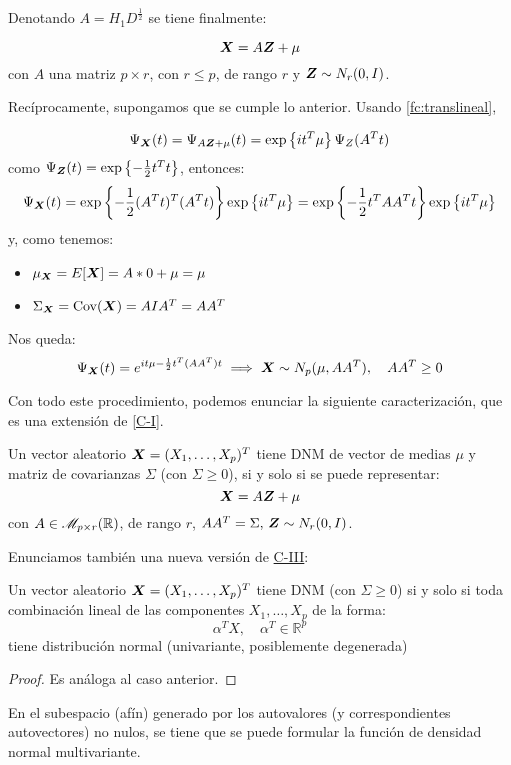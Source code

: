 Denotando $A= H_1D^{\frac{1}{2}}$ se tiene finalmente:

\[
\boldsymbol{X} = A\boldsymbol{Z} + \mu
\]
con $A$ una matriz $p\times r$, con $r\leq p$, de rango $r$ y $\boldsymbol{Z}\sim N_r(0,I)$.

Recíprocamente, supongamos que se cumple lo anterior. Usando \ref{fc:translineal},

\[
\Psi_{\boldsymbol{X}}(t) = \Psi_{A\boldsymbol{Z} + \mu}(t)  = \exp\left\{it^T \mu\right\}\Psi_Z(A^Tt)
\]
como $\Psi_{\boldsymbol{Z}}(t) = \exp\left\{-\frac{1}{2}t^T t\right\}$, entonces:
\[
 \Psi_{\boldsymbol{X}}(t) = \exp\left\{-\frac{1}{2}(A^T t)^T(A^T t)\right\} \exp\left\{it^T \mu\right\} = \exp\left\{-\frac{1}{2}t^T A A^T t\right\} \exp\left\{it^T \mu\right\} 
\]
y, como tenemos:
\begin{itemize}
  \item $\mu_{\boldsymbol{X}} = E[\boldsymbol{X}]=A*0 +\mu = \mu$
  \item $\Sigma_{\boldsymbol{X}} = \operatorname{Cov}(\boldsymbol{X}) = AIA^T = AA^T$
\end{itemize}
Nos queda:
\[
 \Psi_{\boldsymbol{X}}(t)= e^{it\mu - \frac{1}{2}t^T(AA^T)t} \implies \boldsymbol{X} \sim N_p(\mu, AA^T), \quad AA^T \geq 0
\]

Con todo este procedimiento, podemos enunciar la siguiente caracterización, que es una extensión de \hyperref[posvar:car-i]{[C-I]}.
\begin{nprop}[Caracterización I]
  Un vector aleatorio $\boldsymbol{X} = (X_1,\dots,X_p)^T$ tiene DNM de vector de medias $\mu$ y matriz de covarianzas $\Sigma$ (con $\Sigma \geq 0$), si y solo si se puede representar:
  \[
  \boldsymbol{X} = A\boldsymbol{Z} + \mu
  \] con $A\in \mathscr{M}_{p\times r}(\mathbb{R})$, de rango $r$, $AA^T = \Sigma,\, \boldsymbol{Z}\sim N_r(0,I)$.
\end{nprop}

Enunciamos también una nueva versión de \hyperref[posvar:car-iii]{C-III}:
\begin{nprop}
  Un vector aleatorio $\boldsymbol{X} = (X_1,\dots,X_p)^T$ tiene DNM (con $\Sigma \geq 0$) si y solo si toda combinación lineal de las componentes $X_1,\dots,X_p$ de la forma:
\[
  \alpha^T X, \quad \alpha^T \in \mathbb R^p
\]
tiene distribución normal (univariante, posiblemente degenerada)
\end{nprop}
\begin{proof}
Es análoga al caso anterior.
\end{proof}

\begin{ndef}
  En el subespacio (afín) generado por los autovalores (y correspondientes autovectores) no nulos, se tiene que se puede formular la función de densidad normal multivariante.

\end{ndef}

